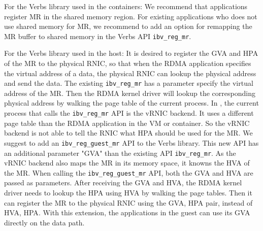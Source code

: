 For the Verbs library used in the containers: We recommend that applications register MR in the shared memory region. For existing applications who does not use shared memory for MR, we recommend to add an option for remapping the MR buffer to shared memory in the Verbs API \texttt{ibv\_reg\_mr}.

For the Verbs library used in the host: It is desired to register the GVA and HPA of the MR to the physical RNIC, so that when the RDMA application specifies the virtual address of a data, the physical RNIC can lookup the physical address and send the data.
The existing \texttt{ibv\_reg\_mr} has a parameter specify the virtual address of the MR. Then the RDMA kernel driver will lookup the corresponding physical address by walking the page table of the current process.
In \sys, the current process that calls the \texttt{ibv\_reg\_mr} API is the vRNIC backend. It uses a different page table than the RDMA application in the VM or container. So the vRNIC backend is not able to tell the RNIC what HPA should be used for the MR.
We suggest to add an \texttt{ibv\_reg\_guest\_mr} API to the Verbs library. This new API has an additional parameter "GVA" than the existing API \texttt{ibv\_reg\_mr}. As the vRNIC backend also maps the MR in its memory space, it knowns the HVA of the MR. When calling the \texttt{ibv\_reg\_guest\_mr} API, both the GVA and HVA are passed as parameters. After receiving the GVA and HVA, the RDMA kernel driver needs to lookup the HPA using HVA by walking the page tables. Then it can register the MR to the physical RNIC using the {GVA, HPA} pair, instead of {HVA, HPA}.
With this extension, the applications in the guest can use its GVA directly on the data path.
